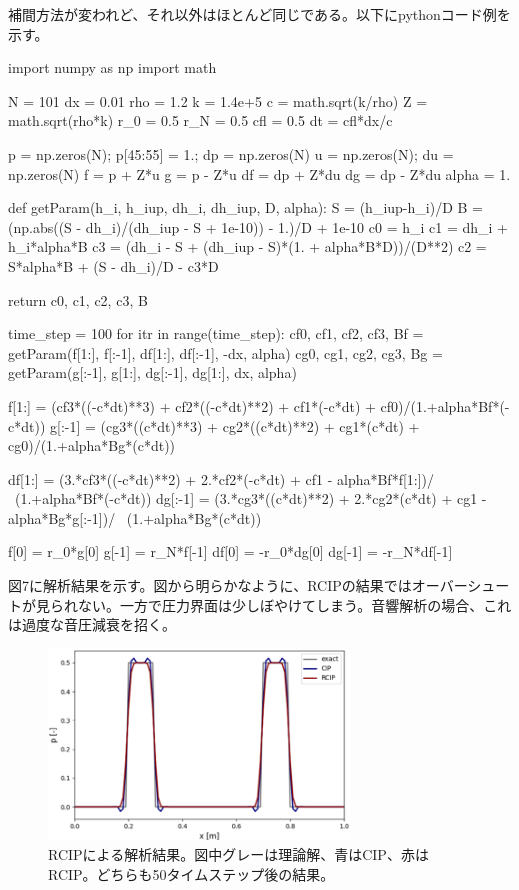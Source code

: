 \documentclass[dvipdfmx, 9pt, a4paper]{jsarticle}
\begin{document}
補間方法が変われど、それ以外はほとんど同じである。以下にpythonコード例を示す。
\begin{python}
import numpy as np
import math

N = 101
dx = 0.01
rho = 1.2
k = 1.4e+5
c = math.sqrt(k/rho)
Z = math.sqrt(rho*k)
r_0 = 0.5
r_N = 0.5
cfl = 0.5
dt = cfl*dx/c

p = np.zeros(N); p[45:55] = 1.; dp = np.zeros(N)
u = np.zeros(N); du = np.zeros(N)
f = p + Z*u
g = p - Z*u
df = dp + Z*du
dg = dp - Z*du
alpha = 1.


def getParam(h_i, h_iup, dh_i, dh_iup, D, alpha):
	S = (h_iup-h_i)/D
	B = (np.abs((S - dh_i)/(dh_iup - S + 1e-10)) - 1.)/D + 1e-10
	c0 = h_i
	c1 = dh_i + h_i*alpha*B
	c3 = (dh_i - S + (dh_iup - S)*(1. + alpha*B*D))/(D**2)
	c2 = S*alpha*B + (S - dh_i)/D - c3*D

	return c0, c1, c2, c3, B

time_step = 100
for itr in range(time_step):
	cf0, cf1, cf2, cf3, Bf = getParam(f[1:], f[:-1], df[1:], df[:-1], -dx, alpha)
	cg0, cg1, cg2, cg3, Bg = getParam(g[:-1], g[1:], dg[:-1], dg[1:], dx, alpha)

	f[1:] = (cf3*((-c*dt)**3) + cf2*((-c*dt)**2) + cf1*(-c*dt) + cf0)/(1.+alpha*Bf*(-c*dt))
	g[:-1] = (cg3*((c*dt)**3) + cg2*((c*dt)**2) + cg1*(c*dt) + cg0)/(1.+alpha*Bg*(c*dt))

	df[1:] = (3.*cf3*((-c*dt)**2) + 2.*cf2*(-c*dt) + cf1 - alpha*Bf*f[1:])/ \
		(1.+alpha*Bf*(-c*dt))
	dg[:-1] = (3.*cg3*((c*dt)**2) + 2.*cg2*(c*dt) + cg1 - alpha*Bg*g[:-1])/ \
		(1.+alpha*Bg*(c*dt))

	f[0] = r_0*g[0]
	g[-1] = r_N*f[-1]
	df[0] = -r_0*dg[0]
	dg[-1] = -r_N*df[-1]

\end{python}\par
図7に解析結果を示す。図から明らかなように、RCIPの結果ではオーバーシュートが見られない。一方で圧力界面は少しぼやけてしまう。音響解析の場合、これは過度な音圧減衰を招く。

\begin{figure}[t]
\begin{center}
\includegraphics[width=8cm]{"fig7.png"}
\caption{RCIPによる解析結果。図中グレーは理論解、青はCIP、赤はRCIP。どちらも50タイムステップ後の結果。}
\end{center}
\end{figure}
\end{document}
